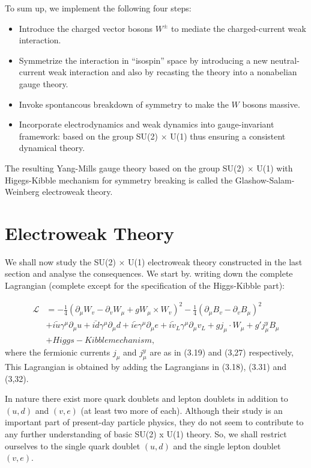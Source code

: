 To sum up, we implement the following four steps: 
\begin{itemize}
\item Introduce the charged vector bosons $W^{\pm}$ to mediate the charged-current weak interaction. 
\item Symmetrize the interaction in “isospin” space by introducing a new neutral-current weak interaction and also by recasting the theory into a nonabelian gauge theory.
\item Invoke spontancous breakdown of symmetry to make the $W$ bosons massive. 
\item Incorporate electrodynamics and weak dynamics into gauge-invariant framework: based on the group SU(2) $\times$ U(1) thus ensuring a consistent dynamical theory.  
\end{itemize}

The resulting Yang-Mills gauge theory based on the group SU(2) $\times$ U(1) with Higegs-Kibble mechanism for symmetry breaking is called the Glashow-Salam-Weinberg electroweak theory. 

\section{Electroweak Theory}

We shall now study the SU(2) $\times$ U(1) electroweak theory constructed in the last section and analyse the consequences. We start by. writing down the complete Lagrangian (complete except for the specification of the Higgs-Kibble part): 

{\fontsize{8}{10}\selectfont\begin{align*}
\mathcal{L} &= - \frac{1}{4}(\partial_{\mu} W_{v} - \partial_{v}W_{\mu} + g W_{\mu} \times W_{v})^{2}- \frac{1}{4} (\partial_{\mu} B_{v}-\partial_{v}B_{\mu})^{2}\\
&+ \bar{iu}\gamma^{\mu} \partial_{\mu}u + \bar{id}\gamma^{\mu} \partial_{\mu}d + \bar{ie}\gamma^{\mu}\partial_{\mu}e + \bar{iv}_{L} \gamma^{\mu}\partial_{\mu}v_{L} + g j_{\mu} \cdot W_{\mu} + g' j^{y}_{\mu}B_{\mu}\tag{4.1}\\
&+ {Higgs-Kibble mechanism},
\end{align*}}
where the fermionic currents $j_{\mu}$ and $j^{y}_{\mu}$ are as in (3.19) and (3,27) respectively, This Lagrangian is
obtained by adding the Lagrangians in (3.18), (3.31) and (3,32).

In nature there exist more quark doublets and lepton doublets in addition to $(u, d)$ and $(v,e)$ (at least two more of each). Although their study is an important part of present-day particle physics, they do not seem to contribute to any further understanding of basic SU(2) x U(1) theory. So, we shall restrict ourselves to the single quark doublet $(u,d)$ and the single lepton doublet $(v,e)$.

